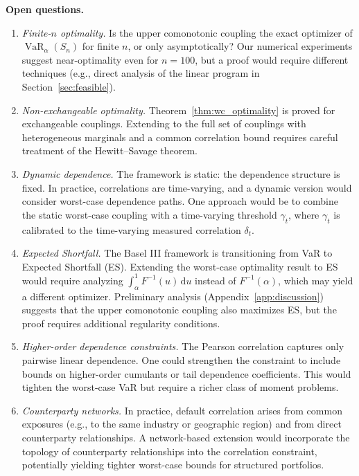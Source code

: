 \documentclass[11pt]{article}
\theoremstyle{definition}
\newcommand{\dd}{\mathrm{d}}
\newcommand{\VaR}{\operatorname{VaR}}
\newcommand{\1}{\mathbf{1}}
\begin{document}
\noindent\textbf{Open questions.}
\begin{enumerate}
  \item \emph{Finite-$n$ optimality.} Is the upper comonotonic coupling the exact optimizer of $\VaR_\alpha(S_n)$ for finite $n$, or only asymptotically? Our numerical experiments suggest near-optimality even for $n = 100$, but a proof would require different techniques (e.g., direct analysis of the linear program in Section~\ref{sec:feasible}).

  \item \emph{Non-exchangeable optimality.} Theorem~\ref{thm:wc_optimality} is proved for exchangeable couplings. Extending to the full set of couplings with heterogeneous marginals and a common correlation bound requires careful treatment of the Hewitt--Savage theorem.

  \item \emph{Dynamic dependence.} The framework is static: the dependence structure is fixed. In practice, correlations are time-varying, and a dynamic version would consider worst-case dependence paths. One approach would be to combine the static worst-case coupling with a time-varying threshold $\gamma_t$, where $\gamma_t$ is calibrated to the time-varying measured correlation $\delta_t$.

  \item \emph{Expected Shortfall.} The Basel III framework is transitioning from VaR to Expected Shortfall (ES). Extending the worst-case optimality result to ES would require analyzing $\int_\alpha^1 F^{-1}(u)\,\dd u$ instead of $F^{-1}(\alpha)$, which may yield a different optimizer. Preliminary analysis (Appendix~\ref{app:discussion}) suggests that the upper comonotonic coupling also maximizes ES, but the proof requires additional regularity conditions.

  \item \emph{Higher-order dependence constraints.} The Pearson correlation captures only pairwise linear dependence. One could strengthen the constraint to include bounds on higher-order cumulants or tail dependence coefficients. This would tighten the worst-case VaR but require a richer class of moment problems.

  \item \emph{Counterparty networks.} In practice, default correlation arises from common exposures (e.g., to the same industry or geographic region) and from direct counterparty relationships. A network-based extension would incorporate the topology of counterparty relationships into the correlation constraint, potentially yielding tighter worst-case bounds for structured portfolios.
\end{enumerate}
\end{document}
